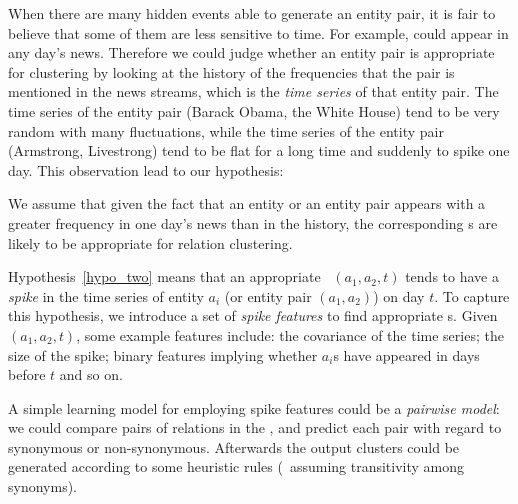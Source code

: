 When there are many hidden events able to generate an entity pair, it is fair to believe that some of them are less sensitive to time. For example,  could appear in any day's news. Therefore we could judge whether an entity pair is appropriate for clustering by looking at the history of the frequencies that the pair is mentioned in the news streams, which is the {\em time series} of that entity pair. The time series of the entity pair (Barack Obama, the White House) tend to be very random with many fluctuations, while the time series of the entity pair (Armstrong, Livestrong) tend to be flat for a long time and suddenly to spike one day. This observation lead to our hypothesis:


\begin{hypothesis}
	\label{hypo_two}
We assume that given the fact that an entity or an entity pair appears with a greater frequency in one day's news than in the history, the corresponding \eec s are likely to be appropriate for relation clustering.
\end{hypothesis}

Hypothesis~\ref{hypo_two} means that an appropriate \eec\ $(a_1,a_2,t)$ tends to have a {\em spike} in the time series of entity $a_i$ (or entity pair $(a_1,a_2)$) on day $t$. To capture this hypothesis, we introduce a set of {\em spike features} to find appropriate \eec s. Given $(a_1,a_2,t)$, some example features include: the covariance of the time series; the size of the spike; binary features implying whether $a_i$s have appeared in days before $t$ and so on.

A simple learning model for employing spike features could be a {\em pairwise model}: we could compare pairs of relations in the \bag, and predict each pair with regard to synonymous or non-synonymous. Afterwards the output clusters could be generated according to some heuristic rules (\eg\ assuming transitivity among synonyms).


